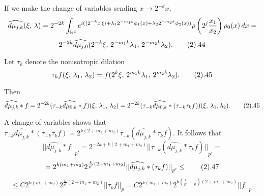 If we make the change of variables sending $x \to 2^{-k}x$, 
$$ 
\widehat{d\mu_{j,k}}(\xi,\,\lambda)= 
2^{-2k}\int_{{\Bbb R}^2} e^{i(
\langle 2^{-k}x\,\xi\rangle+\lambda_1 2^{-m_1k}\phi_1(x)+\lambda_2 2^{-m_2k}\phi_2(x))}
\rho\left(2^{j}\frac{x_1}{x_2}\right) \rho_0(x)\,dx = 
$$
$$
2^{-2k}  \widehat{d\mu_{j,0}}(2^{-k}\xi, \,2^{-m_1k}\lambda_1,\,  
2^{-m_2k}\lambda_2).
\tag 2.44$$

Let $\tau_k$ denote the nonisotropic dilation
$$ \tau_k f(\xi,\,\lambda_1,\,\lambda_2)=
f(2^k\xi,\,2^{m_1k}\lambda_1,\, 2^{m_2k}\lambda_2).\tag 2.45
$$

Then
$$ \widehat{d\mu_{j,k}}*f= 
2^{-2k}( \tau_{-k}  \widehat{d\mu_{0,k}}*f)(\xi,\,\lambda_1,\,\lambda_2)=
2^{-2k}( \tau_{-k}  \widehat{d\mu_{0,k}}*
( \tau_{-k} \tau_kf))(\xi,\,\lambda_1,\lambda_2).\tag 2.46
$$

A change of variables shows that 
$ \tau_{-k}  \widehat{d\mu_{j,k}}*(\tau_{-k} \tau_kf)=
2^{k(2+m_1+m_2)} \tau_{-k}(\widehat{d\mu_{j,k}}*\tau_kf).$
It follows that 
$${||{  \widehat{d\mu_{j,k}}*f}||}_{p'}= 
2^{-2k+ k(2+m_1+m_2)}
{||{ \tau_{- k}(\widehat{d\mu_{j,k}}*\tau_kf)}||}_{p'}=$$
$$=2^{k(m_1+ m_2)}
2^{\frac{k}{p'} (2+m_1+ m_2)}
{||{  \widehat{d\mu_{j,k}}*( \tau_kf)}||}_{p'}\leq
\tag 2.47
$$
$$\leq C 2^{k(m_1+ m_2)}
2^{\frac{k}{p'} (2+m_1+m_2)}
{||{ \tau_ kf}||}_{p}= 
C2^{k(m_1+ m_2)}
2^{k\left(\frac{1}{ p'}-\frac{1}{p}\right) (2+m_1+ m_2)}
{||{f}||}_{p}.$$


